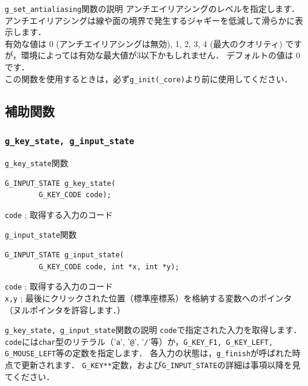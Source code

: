 \documentclass[platex,a4paper,12pt]{jsarticle}%
\begin{document}
\begin{itembox}[l]{\texttt{g\_set\_antialiasing}関数の説明}
アンチエイリアシングのレベルを指定します．\\
アンチエイリアシングは線や面の境界で発生するジャギーを低減して滑らかに表示します．\\

有効な値は 0 (アンチエイリアシングは無効), 1, 2, 3, 4 (最大のクオリティ) ですが，環境によっては有効な最大値が3以下かもしれません．
デフォルトの値は 0 です．\\

この関数を使用するときは，必ず\verb|g_init(_core)|より前に使用してください．
\end{itembox}

\clearpage
\subsection{補助関数}

\subsubsection{\texttt{g\_key\_state, g\_input\_state}}

\begin{itembox}[l]{\texttt{g\_key\_state}関数}
\begin{verbatim}
G_INPUT_STATE g_key_state(
        G_KEY_CODE code);
\end{verbatim}
\verb|code| ; 取得する入力のコード
\end{itembox}

\begin{itembox}[l]{\texttt{g\_input\_state}関数}
\begin{verbatim}
G_INPUT_STATE g_input_state(
        G_KEY_CODE code, int *x, int *y);
\end{verbatim}
\verb|code| ; 取得する入力のコード\\
\verb|x,y| ; 最後にクリックされた位置（標準座標系）を格納する変数へのポインタ（ヌルポインタを許容します．）
\end{itembox}

\begin{itembox}[l]{\texttt{g\_key\_state, g\_input\_state}関数の説明}
\verb|code|で指定された入力を取得します．
\verb|code|には\verb|char|型のリテラル（'\verb|a|', '\verb|@|', '\verb|/|'等）か，\verb|G_KEY_F1, G_KEY_LEFT, G_MOUSE_LEFT|等の定数を指定します．
各入力の状態は，\verb|g_finish|が呼ばれた時点で更新されます．
\verb|G_KEY**|定数，および\verb|G_INPUT_STATE|の詳細は事項以降を見てください．
\end{itembox}
\end{document}
